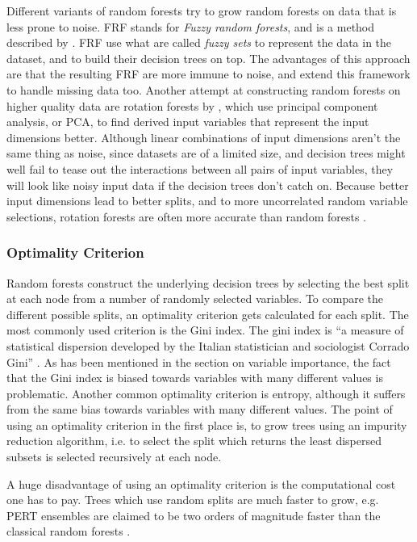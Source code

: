\documentclass[a4paper,man,12pt,apacite,floatsintext,draftfirst]{apa6} %
\begin{document}
Different variants of random forests try to grow random forests on data
that is less prone to noise.
FRF stands for \emph{Fuzzy random forests}, and is a method described by
\cite{bonissone2008fuzzy}.
FRF use what are called \emph{fuzzy sets} to represent the data in the dataset,
and to build their decision trees on top.
The advantages of this approach are that the resulting FRF are more immune
to noise, and \cite{cadenas2012extending} extend this framework to
handle missing data too.
Another attempt at constructing random forests on higher quality data are
rotation forests by \cite{rodriguez2006rotation}, which use
principal component analysis, or PCA, to find derived input variables that
represent the input dimensions better.
Although linear combinations of input dimensions aren't the same thing
as noise, since datasets are of a limited size, and decision trees
might well fail to tease out the interactions between all pairs of input
variables, they will look like noisy input data if the decision trees
don't catch on.
Because better input dimensions lead to better splits, and to more
uncorrelated random variable selections, rotation forests are often more
accurate than random forests \cite{rodriguez2006rotation}.

\subsubsection{Optimality Criterion}
Random forests construct the underlying decision trees by selecting the
best split at each node from a number of randomly selected variables.
To compare the different possible splits, an optimality criterion gets
calculated for each split.
The most commonly used criterion is the Gini index.
The gini index is “a measure of statistical dispersion developed by the
Italian statistician and sociologist Corrado Gini” \cite{wpGINI}.
As has been mentioned in the section on variable importance, the fact that
the Gini index is biased towards variables with many different values
is problematic.
Another common optimality criterion is entropy, although it suffers from
the same bias towards variables with many different values.
The point of using an optimality criterion in the first place is,
to grow trees using an impurity reduction algorithm, i.e. to select the split
which returns the least dispersed subsets is selected recursively at each node.

A huge disadvantage of using an optimality criterion is the computational cost
one has to pay.
Trees which use random splits are much faster to grow, e.g. PERT ensembles
are claimed to be two orders of magnitude faster than the classical
random forests \cite{cutler2001pert}.
\end{document}
